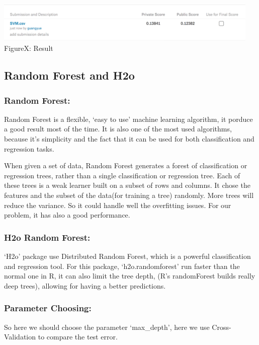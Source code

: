 \documentclass[a4paper]{article}
\begin{document}
	\begin{center}
	\includegraphics[width=5in]{svmres.png}\\
	FigureX: Result
	\end{center}

\subsection{Random Forest and H2o}

	\subsubsection{Random Forest:}
	
	Random Forest is a flexible, `easy to use' machine learning algorithm, it porduce a good result most of the time. It is also one of the most used algorithms, because it's simplicity and the fact that it can be used for both classification and regression tasks.

	When given a set of data, Random Forest generates a forest of classification or regression trees, rather than a single classification or regression tree. Each of these trees is a weak learner built on a subset of rows and columns. It chose the features and the subset of the data(for training a tree) randomly. More trees will reduce the variance. So it could handle well the overfitting issues. For our problem, it has also a good performance.

	\subsubsection{H2o Random Forest:}

	`H2o' package use Distributed Random Forest, which is a powerful classification and regression tool. For this package, `h2o.randomforest' run faster than the normal one in R, it can also limit the tree depth, (R's randomForest builds really deep trees), allowing for having a better predictions.

	\subsubsection{Parameter Choosing:}

	So here we should choose the parameter `max\_depth', here we use Cross-Validation to compare the test error.
\end{document}
